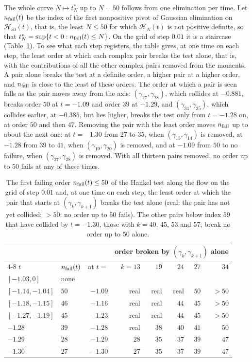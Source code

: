 The whole curve $N\mapsto t^*_N$ up to $N=50$ follows from one elimination per time. Let $n_{\rm fail}(t)$ be the index of the first nonpositive pivot of Gaussian elimination on $\mathcal H_{50}(t)$, that is, the least $N\le50$ for which $\mathcal H_N(t)$ is not positive definite, so that $t^*_N=\sup\{t<0:n_{\rm fail}(t)\le N\}$. On the grid of step $0.01$ it is a staircase \cite{P26wig} (Table~\ref{tab:ch21:nfail}). To see what each step registers, the table gives, at one time on each step, the least order at which each complex pair breaks the test alone, that is, with the contributions of all the other complex pairs removed from the moments. A pair alone breaks the test at a definite order, a higher pair at a higher order, and $n_{\rm fail}$ is close to the least of these orders. The order at which a pair is seen falls as the pair moves away from the axis: $(\gamma_{27},\gamma_{28})$, which collides at $-0.881$, breaks order $50$ at $t=-1.09$ and order $39$ at $-1.29$, and $(\gamma_{34},\gamma_{35})$, which collides earlier, at $-0.385$, but lies higher, breaks the test only from $t=-1.28$ on, at order $50$ and then $47$. Removing the pair with the least order moves $n_{\rm fail}$ up to about the next one: at $t=-1.30$ from $27$ to $35$, when $(\gamma_{13},\gamma_{14})$ is removed, at $-1.28$ from $39$ to $41$, when $(\gamma_{19},\gamma_{20})$ is removed, and at $-1.09$ from $50$ to no failure, when $(\gamma_{27},\gamma_{28})$ is removed. With all thirteen pairs removed, no order up to $50$ fails at any of these times.

\begin{table}[htbp]
\centering\small
\begin{tabular}{llrrrrrr}
\toprule
& & & \multicolumn{5}{c}{order broken by $(\gamma_k,\gamma_{k+1})$ alone}\\
\cmidrule(l){4-8}
$t$ & $n_{\rm fail}(t)$ & at $t=$ & $k=13$ & $19$ & $24$ & $27$ & $34$\\
\midrule
$[-1.03,0]$ & none & & & & & & \\
$[-1.14,-1.04]$ & $50$ & $-1.09$ & real & real & real & $50$ & $>50$\\
$[-1.18,-1.15]$ & $46$ & $-1.16$ & real & real & $44$ & $45$ & $>50$\\
$[-1.27,-1.19]$ & $45$ & $-1.23$ & real & real & $44$ & $45$ & $>50$\\
$-1.28$ & $39$ & $-1.28$ & real & $38$ & $40$ & $41$ & $50$\\
$-1.29$ & $28$ & $-1.29$ & $28$ & $35$ & $37$ & $39$ & $47$\\
$-1.30$ & $27$ & $-1.30$ & $27$ & $35$ & $37$ & $39$ & $47$\\
\bottomrule
\end{tabular}
\caption{The first failing order $n_{\rm fail}(t)\le50$ of the Hankel test along the flow on the grid of step $0.01$ and, at one time on each step, the least order at which the pair that starts at $(\gamma_k,\gamma_{k+1})$ breaks the test alone (real: the pair has not yet collided; $>50$: no order up to $50$ fails). The other pairs below index $59$ that have collided by $t=-1.30$, those with $k=40$, $45$, $53$ and $57$, break no order up to $50$ alone.}
\label{tab:ch21:nfail}
\end{table}

